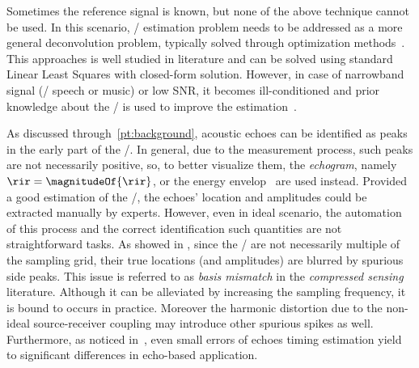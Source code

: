 \mynewline
Sometimes the reference signal is known, but none of the above technique cannot be used.
In this scenario, \RIR/ estimation problem needs to be addressed as a more general deconvolution problem, typically solved through optimization methods~.
This approaches is well studied in literature and can be solved using standard Linear Least Squares with closed-form solution.
However, in case of narrowband signal (\eg/ speech or music) or low SNR, it becomes ill-conditioned and prior knowledge about the \RIR/ is used to improve the estimation~.

As discussed through~\cref{pt:background}, acoustic echoes can be identified as peaks in the early part of the \RIR/.
In general, due to the measurement process, such peaks are not necessarily positive, so, to better visualize them, the \textit{echogram}, namely $\rir = \magnitudeOf{\rir}$, or the energy envelop~ are used instead.
Provided a good estimation of the \RIR/, the echoes' location and amplitudes could be extracted manually by experts.
However, even in ideal scenario, the automation of this process and the correct identification such quantities are not straightforward tasks.
As showed in , since the \TOAs/ are not necessarily multiple of the sampling grid, their true locations (and amplitudes) are blurred by spurious side peaks.
This issue is referred to as \textit{basis mismatch} in the \textit{compressed sensing} literature.
Although it can be alleviated by increasing the sampling frequency, it is bound to occurs in practice.
Moreover the harmonic distortion due to the non-ideal source-receiver coupling may introduce other spurious spikes as well.
Furthermore, as noticed in~, even small errors of echoes timing estimation yield to significant differences in echo-based application.

